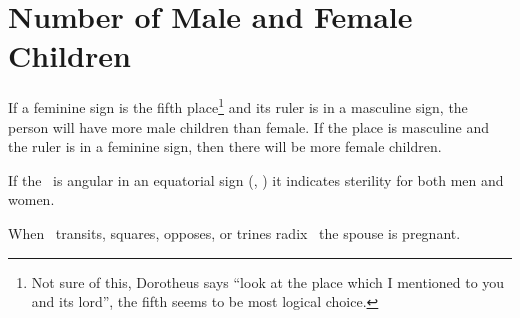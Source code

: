 \section{Number of Male and Female Children}
If a feminine sign is the fifth place\footnote{Not sure of this, Dorotheus says ``look at the place which I mentioned to you and its lord'', the fifth seems to be most logical choice.} and its ruler is in a masculine sign, the person will have more male children than female. If the place is masculine and the ruler is in a feminine sign, then there will be more female children.

If the \Moon\, is angular in an equatorial sign (\Aries, \Libra) it indicates sterility for both men and women.

When \Jupiter\, transits, squares, opposes, or trines radix \Mars\, the spouse is pregnant.